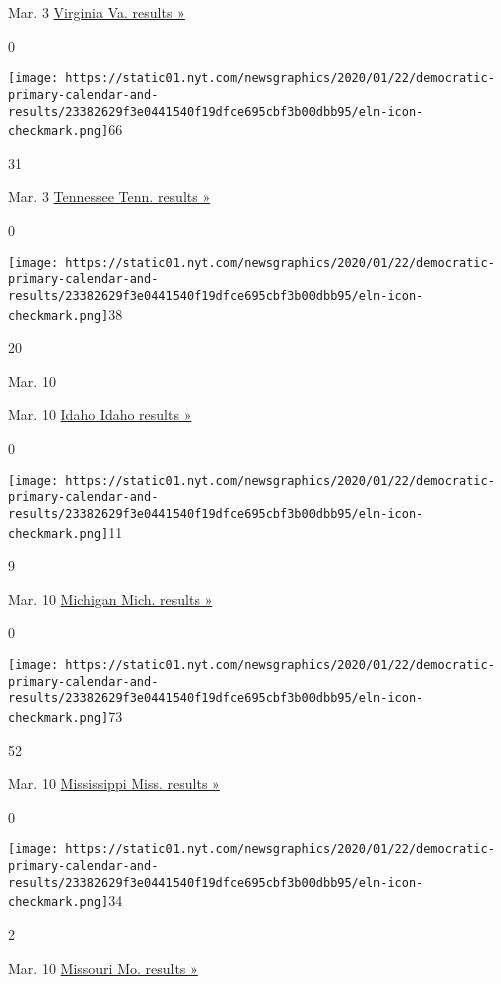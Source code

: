 Mar. 3
\href{https://www.nytimes.com/interactive/2020/03/03/us/elections/results-virginia-president-democrat-primary-election.html}{Virginia
Va. results »}

0

\texttt{[image: https://static01.nyt.com/newsgraphics/2020/01/22/democratic-primary-calendar-and-results/23382629f3e0441540f19dfce695cbf3b00dbb95/eln-icon-checkmark.png]}66

31

Mar. 3
\href{https://www.nytimes.com/interactive/2020/03/03/us/elections/results-tennessee-president-democrat-primary-election.html}{Tennessee
Tenn. results »}

0

\texttt{[image: https://static01.nyt.com/newsgraphics/2020/01/22/democratic-primary-calendar-and-results/23382629f3e0441540f19dfce695cbf3b00dbb95/eln-icon-checkmark.png]}38

20

Mar. 10

Mar. 10
\href{https://www.nytimes.com/interactive/2020/03/10/us/elections/results-idaho-president-democrat-primary-election.html}{Idaho
Idaho results »}

0

\texttt{[image: https://static01.nyt.com/newsgraphics/2020/01/22/democratic-primary-calendar-and-results/23382629f3e0441540f19dfce695cbf3b00dbb95/eln-icon-checkmark.png]}11

9

Mar. 10
\href{https://www.nytimes.com/interactive/2020/03/10/us/elections/results-michigan-president-democrat-primary-election.html}{Michigan
Mich. results »}

0

\texttt{[image: https://static01.nyt.com/newsgraphics/2020/01/22/democratic-primary-calendar-and-results/23382629f3e0441540f19dfce695cbf3b00dbb95/eln-icon-checkmark.png]}73

52

Mar. 10
\href{https://www.nytimes.com/interactive/2020/03/10/us/elections/results-mississippi-president-democrat-primary-election.html}{Mississippi
Miss. results »}

0

\texttt{[image: https://static01.nyt.com/newsgraphics/2020/01/22/democratic-primary-calendar-and-results/23382629f3e0441540f19dfce695cbf3b00dbb95/eln-icon-checkmark.png]}34

2

Mar. 10
\href{https://www.nytimes.com/interactive/2020/03/10/us/elections/results-missouri-president-democrat-primary-election.html}{Missouri
Mo. results »}

